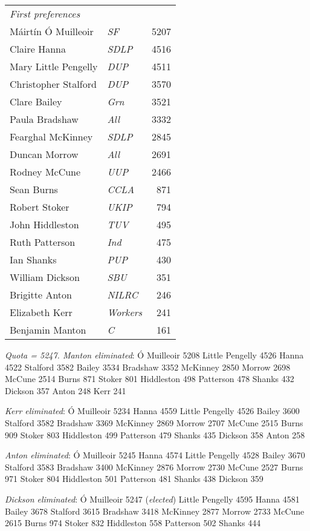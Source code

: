 \begin{resultsiii}
\noindent
\begin{tabular*}{\columnwidth}{@{\extracolsep{\fill}} p{} >{\itshape}l r @{\extracolsep{\fill}}}
	\emph{First preferences}\\
	Máirtín Ó Muilleoir & SF & 5207\\
	Claire Hanna & SDLP & 4516\\
	Mary Little Pengelly & DUP & 4511\\
	Christopher Stalford & DUP & 3570\\
	Clare Bailey & Grn & 3521\\
	Paula Bradshaw & All & 3332\\
	Fearghal McKinney & SDLP & 2845\\
	Duncan Morrow & All & 2691\\
	Rodney McCune & UUP & 2466\\
	Sean Burns & CCLA & 871\\
	Robert Stoker & UKIP & 794\\
	John Hiddleston & TUV & 495\\
	Ruth Patterson & Ind & 475\\
	Ian Shanks & PUP & 430\\
	William Dickson & SBU & 351\\
	Brigitte Anton & NILRC & 246\\
	Elizabeth Kerr & Workers & 241\\
	Benjamin Manton & C & 161\\
\end{tabular*}

\emph{Quota = 5247.  Manton eliminated}: Ó Muilleoir 5208 Little Pengelly 4526 Hanna 4522 Stalford 3582 Bailey 3534 Bradshaw 3352 McKinney 2850 Morrow 2698 McCune 2514 Burns 871 Stoker 801 Hiddleston 498 Patterson 478 Shanks 432 Dickson 357 Anton 248 Kerr 241

\emph{Kerr eliminated}: Ó Muilleoir 5234 Hanna 4559 Little Pengelly 4526 Bailey 3600 Stalford 3582 Bradshaw 3369 McKinney 2869 Morrow 2707 McCune 2515 Burns 909 Stoker 803 Hiddleston 499 Patterson 479 Shanks 435 Dickson 358 Anton 258

\emph{Anton eliminated}: Ó Muilleoir 5245 Hanna 4574 Little Pengelly 4528 Bailey 3670 Stalford 3583 Bradshaw 3400 McKinney 2876 Morrow 2730 McCune 2527 Burns 971 Stoker 804 Hiddleston 501 Patterson 481 Shanks 438 Dickson 359

\emph{Dickson eliminated}: Ó Muilleoir 5247 (\emph{elected}) Little Pengelly 4595 Hanna 4581 Bailey 3678 Stalford 3615 Bradshaw 3418 McKinney 2877 Morrow 2733 McCune 2615 Burns 974 Stoker 832 Hiddleston 558 Patterson 502 Shanks 444


\end{resultsiii}
